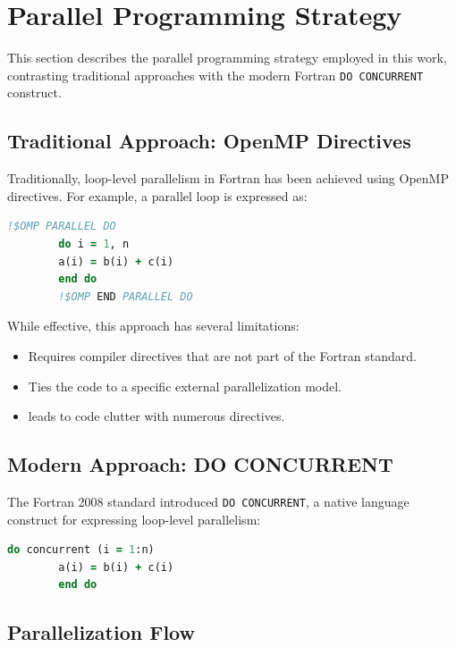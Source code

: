 \documentclass[11pt,a4paper]{article}
\begin{document}
	\section{Parallel Programming Strategy}
	\label{sec:parallel}
	
	This section describes the parallel programming strategy employed in this work, contrasting traditional approaches with the modern Fortran \texttt{DO CONCURRENT} construct.
	
	\subsection{Traditional Approach: OpenMP Directives}
	
	Traditionally, loop-level parallelism in Fortran has been achieved using OpenMP directives. For example, a parallel loop is expressed as:
	
	\begin{lstlisting}[language=Fortran, caption={Traditional OpenMP parallel loop in Fortran.}]
		!$OMP PARALLEL DO
		do i = 1, n
		a(i) = b(i) + c(i)
		end do
		!$OMP END PARALLEL DO
	\end{lstlisting}
	
	While effective, this approach has several limitations:
	\begin{itemize}
		\item Requires compiler directives that are not part of the Fortran standard.
		\item Ties the code to a specific external parallelization model.
		\item leads to code clutter with numerous directives.
	\end{itemize}
	
	\subsection{Modern Approach: DO CONCURRENT}
	
	The Fortran 2008 standard introduced \texttt{DO CONCURRENT}, a native language construct for expressing loop-level parallelism:
	
	\begin{lstlisting}[language=Fortran, caption={Modern Fortran DO CONCURRENT loop.}]
		do concurrent (i = 1:n)
		a(i) = b(i) + c(i)
		end do
	\end{lstlisting}
	
	\subsection{Parallelization Flow}
	
\end{document}
